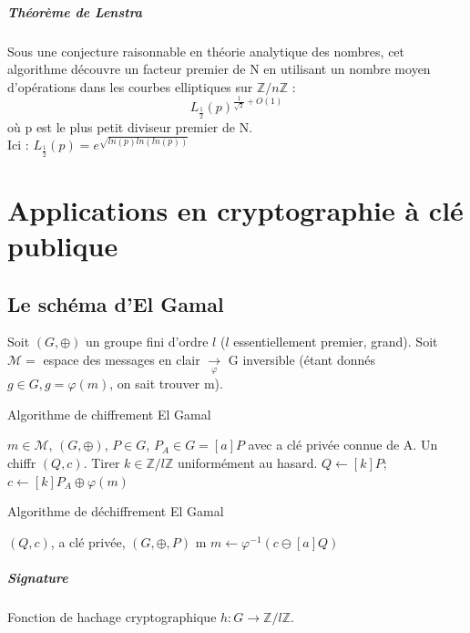 \documentclass[12pt,a4paper]{report}
\begin{document}
\paragraph{Théorème de Lenstra\\}
Sous une conjecture raisonnable en théorie analytique des nombres, cet algorithme découvre un facteur premier de N en utilisant un nombre moyen d'opérations dans les courbes elliptiques sur $\mathbb{Z}/n\mathbb{Z}$ : 
$$ L_{\frac{1}{2}}(p)^{\frac{1}{\sqrt{2}}+O(1)}$$ où p est le plus petit diviseur premier de N.\\
Ici : $ L_{\frac{1}{2}}(p)= e^{\sqrt{ln(p)ln(ln(p))}}$

\chapter{Applications en cryptographie à clé publique}
\section{Le schéma d'El Gamal}
Soit $(G,\oplus)$ un groupe fini d'ordre $l$ ($l$ essentiellement premier, grand).
Soit $ \mathcal{M} = $ espace des messages en clair $\underset{\varphi}{\longrightarrow} $ G inversible (étant donnés $g\in G, g=\varphi(m)$, on sait trouver m).
 \begin{algorithm}[ht]
\caption{Algorithme de chiffrement El Gamal}
\begin{algorithmic}[1]
\REQUIRE $m \in \mathcal{M}$, $(G,\oplus)$, $P \in G$, $P_A \in G = [a]P$ avec a clé privée connue de A.
\ENSURE Un chiffr $(Q,c)$.
\STATE Tirer $k\in \mathbb{Z}/l\mathbb{Z}$ uniformément au hasard.
\STATE $Q \leftarrow [k]P$;
\STATE $c \leftarrow [k]P_A\oplus \varphi(m) $
\end{algorithmic}
\end{algorithm}

 \begin{algorithm}[ht]
\caption{Algorithme de déchiffrement El Gamal}
\begin{algorithmic}[1]
\REQUIRE $(Q,c)$, a clé privée, $(G,\oplus,P)$
\ENSURE m
\STATE $m\leftarrow \varphi^{-1}(c\ominus [a]Q) $
\end{algorithmic}
\end{algorithm}

\paragraph{Signature\\}
Fonction de hachage cryptographique $h : G \rightarrow \mathbb{Z}/l\mathbb{Z}$.
\end{document}
